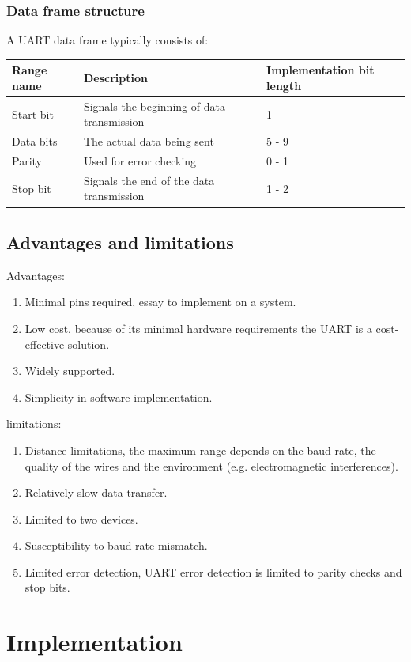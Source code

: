 \documentclass[12pt]{article}
\begin{document}
\subsubsection{Data frame structure}
A UART data frame typically consists of: \\

\begin{tabular}{|p{3cm}|p{6cm}|p{3.5cm}|}
  \hline
  \textbf{Range name} & \textbf{Description} & \textbf{Implementation bit length} \\
  \hline
  Start bit & Signals the beginning of data transmission & 1 \\
  \hline
  Data bits & The actual data being sent & 5 - 9 \\
  \hline
  Parity & Used for error checking & 0 - 1 \\
  \hline
  Stop bit & Signals the end of the data transmission & 1 - 2 \\
  \hline
\end{tabular}

\subsection{Advantages and limitations}
Advantages:
\begin{enumerate}
  \item Minimal pins required, essay to implement on a system.
  \item Low cost, because of its minimal hardware requirements the UART is a
        cost-effective solution.
  \item Widely supported.
  \item Simplicity in software implementation.
\end{enumerate}
limitations:
\begin{enumerate}
  \item Distance limitations, the maximum range depends on the baud rate, the quality
        of the wires and the environment (e.g. electromagnetic interferences).
  \item Relatively slow data transfer.
  \item Limited to two devices.
  \item Susceptibility to baud rate mismatch.
  \item Limited error detection, UART error detection is limited to parity checks and
        stop bits.
\end{enumerate}

\section{Implementation}
\end{document}
